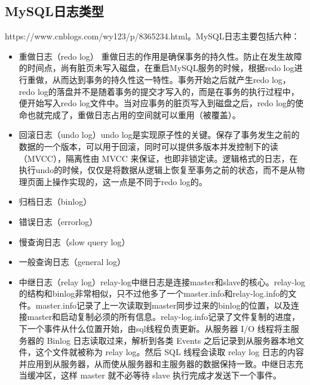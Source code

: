 \documentclass[../../../interview-questions.tex]{subfiles}
\begin{document}
\subsection{MySQL日志类型}

https://www.cnblogs.com/wy123/p/8365234.html。MySQL日志主要包括六种：

\begin{itemize}
    \item {重做日志（redo log）} 重做日志的作用是确保事务的持久性。防止在发生故障的时间点，尚有脏页未写入磁盘，在重启MySQL服务的时候，根据redo log进行重做，从而达到事务的持久性这一特性。事务开始之后就产生redo log，redo log的落盘并不是随着事务的提交才写入的，而是在事务的执行过程中，便开始写入redo log文件中。当对应事务的脏页写入到磁盘之后，redo log的使命也就完成了，重做日志占用的空间就可以重用（被覆盖）。
    \item {回滚日志（undo log）}undo log是实现原子性的关键。保存了事务发生之前的数据的一个版本，可以用于回滚，同时可以提供多版本并发控制下的读（MVCC），隔离性由 MVCC 来保证，也即非锁定读。逻辑格式的日志，在执行undo的时候，仅仅是将数据从逻辑上恢复至事务之前的状态，而不是从物理页面上操作实现的，这一点是不同于redo log的。
    \item {归档日志（binlog）}
    \item {错误日志（errorlog）}
    \item {慢查询日志（slow query log）}
    \item {一般查询日志（general log）}
    \item {中继日志（relay log）}relay-log中继日志是连接master和slave的核心。relay-log的结构和binlog非常相似，只不过他多了一个master.info和relay-log.info的文件。master.info记录了上一次读取到master同步过来的binlog的位置，以及连接master和启动复制必须的所有信息。relay-log.info记录了文件复制的进度，下一个事件从什么位置开始，由sql线程负责更新。从服务器 I/O 线程将主服务器的 Binlog 日志读取过来，解析到各类 Events 之后记录到从服务器本地文件，这个文件就被称为 relay log。然后 SQL 线程会读取 relay log 日志的内容并应用到从服务器，从而使从服务器和主服务器的数据保持一致。中继日志充当缓冲区，这样 master 就不必等待 slave 执行完成才发送下一个事件。
\end{itemize}
\end{document}
